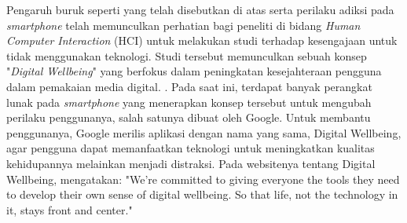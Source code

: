 Pengaruh buruk seperti yang telah disebutkan di atas serta perilaku adiksi pada \textit{smartphone} telah memunculkan perhatian bagi peneliti di bidang \textit{Human Computer Interaction} (HCI) untuk melakukan studi terhadap kesengajaan untuk tidak menggunakan teknologi. Studi tersebut memunculkan sebuah konsep "\textit{Digital Wellbeing}" yang berfokus dalam peningkatan kesejahteraan pengguna dalam pemakaian media digital. \parencite{unesco2015dwconference}. Pada saat ini, terdapat banyak perangkat lunak pada \textit{smartphone} yang menerapkan konsep tersebut untuk mengubah perilaku penggunanya, salah satunya dibuat oleh Google. \parencite{CHI2019SOCIALIZE} Untuk membantu penggunanya, Google merilis aplikasi dengan nama yang sama, Digital Wellbeing, agar pengguna dapat memanfaatkan teknologi untuk meningkatkan kualitas kehidupannya melainkan menjadi distraksi. Pada websitenya tentang Digital Wellbeing, \textcite{google2019digitalwellbeing} mengatakan: "We’re committed to giving everyone the tools they need to develop their own sense of digital wellbeing. So that life, not the technology in it, stays front and center." 



